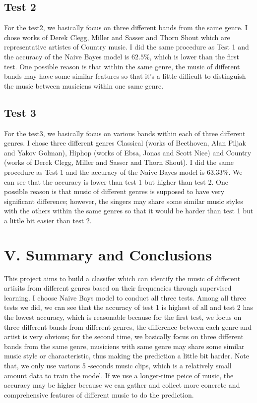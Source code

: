 \documentclass[12pt,letterpaper]{article}
\begin{document}
\subsection*{Test 2}
For the test2, we basically focus on three different bands from the same genre. I chose works of Derek Clegg, Miller and Sasser and Thorn Shout which are representative artistes of Country music. I did the same procedure as Test 1 and the accuracy of the Naive Bayes model is $62.5\%$, which is lower than the first test. One possible reason is that within the same genre, the music of different bands may have some similar features so that it's a little difficult to distinguish the music between musiciens within one same genre. 

\subsection*{Test 3}
For the test3, we basically focus on various bands within each of three different genres. I chose three different genres Classical (works of Beethoven, Alan Piljak and Yakov Golman), Hiphop (works of Ebsa, Jonas and Scott Nice) and Country (works of Derek Clegg, Miller and Sasser and Thorn Shout). I did the same procedure as Test 1 and the accuracy of the Naive Bayes model is $63.33\%$. We can see that the accuracy is lower than test 1 but higher than test 2. One possible reason is that music of different genres is supposed to have very significant difference; however, the singers may share some similar music styles with the others within the same genres so that it would be harder than test 1 but a little bit easier than test 2.

\section*{V. Summary and Conclusions}
This project aims to build a classifer which can identify the music of different artisits from different genres based on their frequencies through supervised learning. I choose Naive Bays model to conduct all three tests. Among all three tests we did, we can see that the accuracy of test 1 is highest of all and test 2 has the lowest accuracy, which is reasonable because for the first test, we focus on three different bands from different genres, the difference between each genre and artist is very obvious; for the second time, we basically focus on three different bands from the same genre, musiciens with same genre may share some similar music style or characteristic, thus making the prediction a little bit harder. Note that, we only use various 5 -seconds music clips, which is a relatively small amount data to train the model. If we use a longer-time peice of music, the accuracy may be higher because we can gather and collect more concrete and comprehensive features of different music to do the prediction. 
\end{document}
